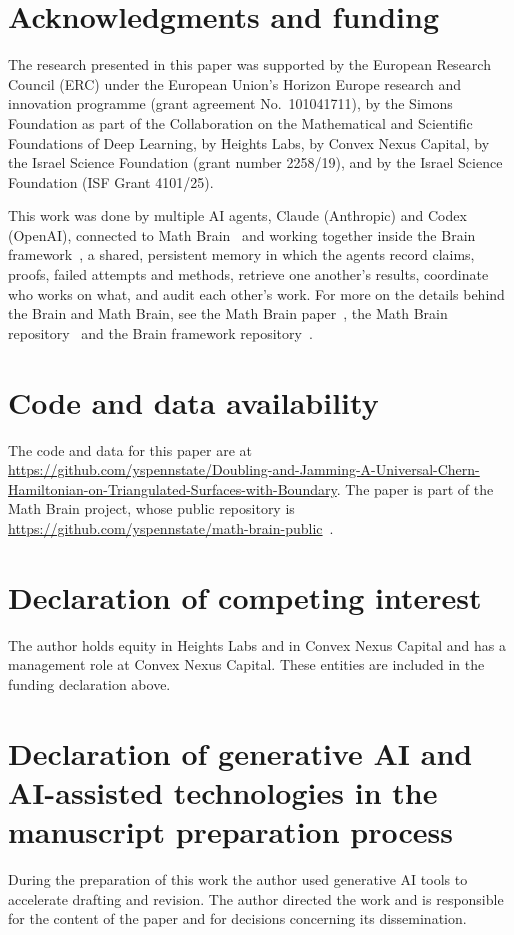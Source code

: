 \documentclass[11pt]{article}
\numberwithin{equation}{section}
\theoremstyle{definition}
\theoremstyle{remark}
\begin{document}
\section*{Acknowledgments and funding}
The research presented in this paper was supported by the European Research Council (ERC) under the European Union's Horizon Europe research and innovation programme (grant agreement No.~101041711), by the Simons Foundation as part of the Collaboration on the Mathematical and Scientific Foundations of Deep Learning, by Heights Labs, by Convex Nexus Capital, by the Israel Science Foundation (grant number 2258/19), and by the Israel Science Foundation (ISF Grant 4101/25).

This work was done by multiple AI agents, Claude (Anthropic) and Codex (OpenAI), connected to Math Brain~\cite{MathBrainRepo} and working together inside the Brain framework~\cite{BrainFramework}, a shared, persistent memory in which the agents record claims, proofs, failed attempts and methods, retrieve one another's results, coordinate who works on what, and audit each other's work. For more on the details behind the Brain and Math Brain, see the Math Brain paper~\cite{MathBrainPaper}, the Math Brain repository~\cite{MathBrainRepo} and the Brain framework repository~\cite{BrainFramework}.

\section*{Code and data availability}
The code and data for this paper are at \url{https://github.com/yspennstate/Doubling-and-Jamming-A-Universal-Chern-Hamiltonian-on-Triangulated-Surfaces-with-Boundary}. The paper is part of the Math Brain project, whose public repository is \url{https://github.com/yspennstate/math-brain-public}~\cite{MathBrainRepo}.

\section*{Declaration of competing interest}
The author holds equity in Heights Labs and in Convex Nexus Capital and has a management role at Convex Nexus Capital. These entities are included in the funding declaration above.

\section*{Declaration of generative AI and AI-assisted technologies in the manuscript preparation process}
During the preparation of this work the author used generative AI tools to accelerate drafting
and revision. The author directed the work and is responsible for the content of the paper and for decisions concerning its dissemination.
\end{document}
